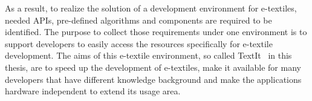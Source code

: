 As a result, to realize the solution of a development environment for e-textiles, needed APIs, pre-defined algorithms and components are required to be identified. The purpose to collect those requirements under one environment is to support developers to easily access the resources specifically for e-textile development. The aims of this e-textile environment, so called TextIt \ in this thesis, are to speed up the development of e-textiles, make it available for many developers that have different knowledge background and make the applications hardware independent to extend its usage area.
